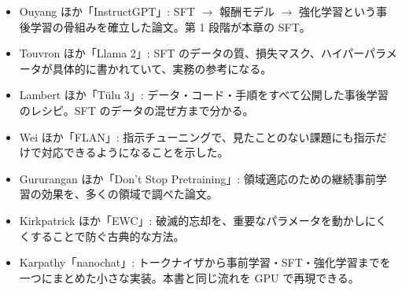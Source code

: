 \begin{itemize}
\item Ouyang ほか「InstructGPT」\cite{ouyang2022training}: SFT $\to$ 報酬モデル $\to$ 強化学習という事後学習の骨組みを確立した論文。第 1 段階が本章の SFT。
\item Touvron ほか「Llama 2」\cite{touvron2023llama2}: SFT のデータの質、損失マスク、ハイパーパラメータが具体的に書かれていて、実務の参考になる。
\item Lambert ほか「T\"ulu 3」\cite{lambert2024tulu3}: データ・コード・手順をすべて公開した事後学習のレシピ。SFT のデータの混ぜ方まで分かる。
\item Wei ほか「FLAN」\cite{wei2022finetuned}: 指示チューニングで、見たことのない課題にも指示だけで対応できるようになることを示した。
\item Gururangan ほか「Don't Stop Pretraining」\cite{gururangan2020dont}: 領域適応のための継続事前学習の効果を、多くの領域で調べた論文。
\item Kirkpatrick ほか「EWC」\cite{kirkpatrick2017overcoming}: 破滅的忘却を、重要なパラメータを動かしにくくすることで防ぐ古典的な方法。
\item Karpathy「nanochat」\cite{karpathy2025nanochat}: トークナイザから事前学習・SFT・強化学習までを一つにまとめた小さな実装。本書と同じ流れを GPU で再現できる。
\end{itemize}

